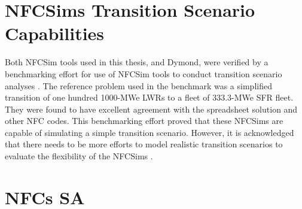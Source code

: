 \section{\glspl{NFCSim} Transition Scenario Capabilities}
Both \gls{NFCSim} tools used in this thesis, \Cyclus and Dymond,
were verified by a benchmarking effort for use of 
\gls{NFCSim} tools to conduct transition scenario analyses
\cite{feng_standardized_2016,bae_standardized_2019}.
The reference problem used in the benchmark was a simplified 
transition of one hundred 1000-MWe \glspl{LWR} to a fleet 
of 333.3-MWe \gls{SFR} fleet. 
They were found to have excellent agreement with the 
spreadsheet solution and other \gls{NFC} codes.  
This benchmarking effort proved that these \glspl{NFCSim}
are capable of simulating a simple transition scenario. 
However, it is acknowledged that there needs to be more efforts 
to model realistic transition scenarios to evaluate the
flexibility of the \glspl{NFCSim} \cite{feng_standardized_2016}.


\section{\glspl{NFC} \gls{SA}}